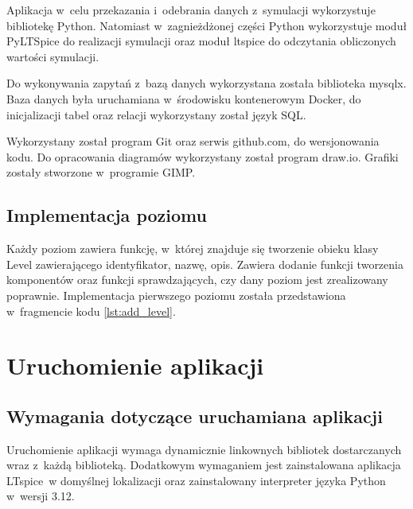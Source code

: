 \documentclass[12pt,a4paper]{article} %
\begin{document}
\aka Aplikacja w~celu przekazania i~odebrania danych z~symulacji wykorzystuje bibliotekę Python. Natomiast w~zagnieżdżonej części Python wykorzystuje moduł PyLTSpice do realizacji symulacji oraz moduł ltspice do odczytania obliczonych wartości symulacji.

\aka Do wykonywania zapytań z~bazą danych wykorzystana została biblioteka mysqlx. Baza danych była uruchamiana w~środowisku kontenerowym Docker, do inicjalizacji tabel oraz relacji wykorzystany został język SQL. 

\aka Wykorzystany został program Git oraz serwis github.com, do wersjonowania kodu. Do opracowania diagramów wykorzystany został program draw.io. Grafiki zostały stworzone w~programie GIMP.


\subsection{Implementacja poziomu}

\aka Każdy poziom zawiera funkcję, w~której znajduje się tworzenie obieku klasy Level zawierającego identyfikator, nazwę, opis. Zawiera dodanie funkcji tworzenia komponentów oraz funkcji sprawdzających, czy dany poziom jest zrealizowany poprawnie. Implementacja pierwszego poziomu została przedstawiona w~fragmencie kodu \ref{lst:add_level}.




\clearpage
\section{Uruchomienie aplikacji}
\subsection{Wymagania dotyczące uruchamiana aplikacji}
Uruchomienie aplikacji wymaga dynamicznie linkownych bibliotek dostarczanych wraz z~każdą biblioteką. Dodatkowym wymaganiem jest zainstalowana aplikacja LTspice~w domyślnej lokalizacji oraz zainstalowany interpreter języka Python w~wersji 3.12.
\end{document}
